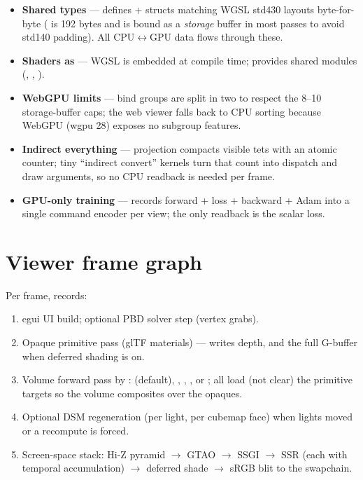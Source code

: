 \begin{itemize}
\item \textbf{Shared types} --- 
  defines \code{#[repr(C)]} +  structs matching WGSL
  std430 layouts byte-for-byte ( is 192 bytes and is bound as
  a \emph{storage} buffer in most passes to avoid std140 padding). All
  CPU$\leftrightarrow$GPU data flows through these.
\item \textbf{Shaders as } --- WGSL is embedded at compile
  time;   provides shared modules
  (, , ).
\item \textbf{WebGPU limits} --- bind groups are split in two to respect the
  8--10 storage-buffer caps; the web viewer falls back to CPU sorting because
  WebGPU (wgpu 28) exposes no subgroup features.
\item \textbf{Indirect everything} --- projection compacts visible tets with
  an atomic counter; tiny ``indirect convert'' kernels turn that count into
  dispatch and draw arguments, so no CPU readback is needed per frame.
\item \textbf{GPU-only training} ---  records forward +
  loss + backward + Adam into a single command encoder per view; the only
  readback is the scalar loss.
\end{itemize}

\section{Viewer frame graph}

Per frame,  records:
\begin{enumerate}
\item egui UI build; optional PBD solver step (vertex grabs).
\item Opaque primitive pass (glTF materials) --- writes depth, and the full
  G-buffer when deferred shading is on.
\item Volume forward pass by : 
  (default), , , , or
  ; all load (not clear) the primitive targets so the volume
  composites over the opaques.
\item Optional DSM regeneration (per light, per cubemap face) when lights
  moved or a recompute is forced.
\item Screen-space stack: Hi-Z pyramid $\to$ GTAO $\to$ SSGI $\to$ SSR (each
  with temporal accumulation) $\to$ deferred shade $\to$ sRGB blit to the
  swapchain.
\end{enumerate}


